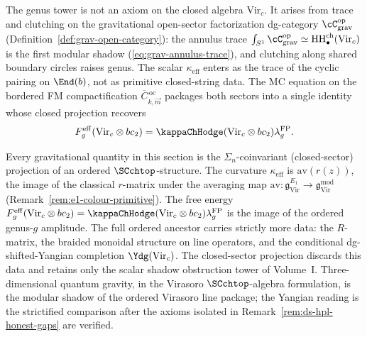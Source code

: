 \begin{remark}
\label{rem:gravity-modularity-open-sector}
The genus tower is not an axiom on the closed algebra
$\mathrm{Vir}_c$. It arises from trace and clutching on the
gravitational open-sector factorization dg-category
$\cC_{\mathrm{grav}}^{\mathrm{op}}$
\textup{(}Definition~\textup{\ref{def:grav-open-category})}: the
annulus trace $\int_{S^1} \cC_{\mathrm{grav}}^{\mathrm{op}}
\simeq \HH^{\mathrm{ch}}_\bullet(\mathrm{Vir}_c)$ is the first modular shadow
\textup{(}\eqref{eq:grav-annulus-trace}\textup{)}, and
clutching along shared boundary circles raises genus. The
scalar $\kappa_{\mathrm{eff}}$ enters as the trace of the
cyclic pairing on $\End(b)$, not as primitive closed-string data.
The MC equation on the bordered FM compactification
$\overline{C}{}^{\,\mathrm{oc}}_{k,\vec{m}}$ packages both
sectors into a single identity whose closed projection recovers
\[
F_g^{\mathrm{eff}}(\mathrm{Vir}_c \otimes bc_2)
= \kappaChHodge(\mathrm{Vir}_c \otimes bc_2)
  \lambda_g^{\mathrm{FP}}.
\]
\end{remark}

\begin{remark}
\label{rem:gravity-closed-sector-projection-genus}%
%
%
Every gravitational quantity in this section is the
$\Sigma_n$-coinvariant (closed-sector) projection of an ordered
$\SCchtop$-structure. The curvature $\kappa_{\mathrm{eff}}$ is
$\mathrm{av}(r(z))$, the image of the classical $r$-matrix
under the averaging map $\mathrm{av}\colon
\mathfrak{g}^{E_1}_{\mathrm{Vir}} \to
\mathfrak{g}^{\mathrm{mod}}_{\mathrm{Vir}}$
(Remark~\ref{rem:e1-colour-primitive}). The free energy
$F_g^{\mathrm{eff}}(\mathrm{Vir}_c \otimes bc_2)
= \kappaChHodge(\mathrm{Vir}_c \otimes bc_2)
\lambda_g^{\mathrm{FP}}$ is the image of the ordered genus-$g$ amplitude. The full ordered
ancestor carries strictly more data: the $R$-matrix, the braided
monoidal structure on line operators, and the conditional
dg-shifted-Yangian completion $\Ydg(\mathrm{Vir}_c)$. The closed-sector
projection discards this data and retains only the scalar
shadow obstruction tower of Volume~I. Three-dimensional quantum
gravity, in the Virasoro $\SCchtop$-algebra formulation, is
the modular shadow of the ordered Virasoro line package; the
Yangian reading is the strictified comparison after the
axioms isolated in Remark~\ref{rem:ds-hpl-honest-gaps} are verified.
\end{remark}

